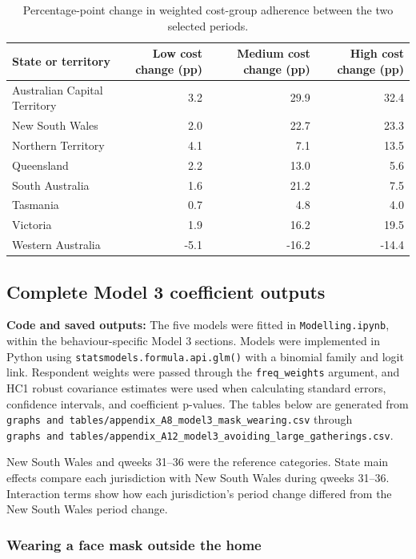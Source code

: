 \documentclass[
  12pt,
  a4paper,
]{article}
\begin{document}
\begin{landscape}
\begin{longtable}[t]{lrrr}
\caption{\label{tab:state-changes}Percentage-point change in weighted cost-group adherence between the two selected periods.}\\
\toprule
State or territory & Low cost change (pp) & Medium cost change (pp) & High cost change (pp)\\
\midrule
Australian Capital Territory & 3.2 & 29.9 & 32.4\\
New South Wales & 2.0 & 22.7 & 23.3\\
Northern Territory & 4.1 & 7.1 & 13.5\\
Queensland & 2.2 & 13.0 & 5.6\\
South Australia & 1.6 & 21.2 & 7.5\\
\addlinespace
Tasmania & 0.7 & 4.8 & 4.0\\
Victoria & 1.9 & 16.2 & 19.5\\
Western Australia & -5.1 & -16.2 & -14.4\\
\bottomrule
\end{longtable}

\small
\end{landscape}
\clearpage

\subsection{Complete Model 3 coefficient outputs}\label{complete-model-3-coefficient-outputs}

\textbf{Code and saved outputs:} The five models were fitted in
\texttt{Modelling.ipynb}, within the behaviour-specific Model 3 sections.
Models were implemented in Python using \texttt{statsmodels.formula.api.glm()}
with a binomial family and logit link. Respondent weights were passed
through the \texttt{freq\_weights} argument, and HC1 robust covariance estimates
were used when calculating standard errors, confidence intervals, and
coefficient p-values. The tables below are generated from
\texttt{graphs\ and\ tables/appendix\_A8\_model3\_mask\_wearing.csv} through
\texttt{graphs\ and\ tables/appendix\_A12\_model3\_avoiding\_large\_gatherings.csv}.

New South Wales and qweeks 31--36 were the reference categories. State
main effects compare each jurisdiction with New South Wales during
qweeks 31--36. Interaction terms show how each jurisdiction's period
change differed from the New South Wales period change.

\subsubsection{Wearing a face mask outside the home}\label{wearing-a-face-mask-outside-the-home}
\end{document}

